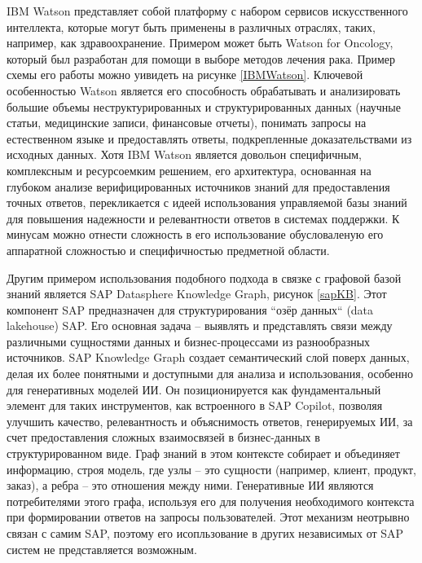 IBM Watson представляет собой платформу с набором сервисов искусственного интеллекта, которые могут быть применены в различных отраслях, таких, например, как здравоохранение. Примером может быть Watson for Oncology, который был разработан для помощи в выборе методов лечения рака. Пример схемы его работы можно уивидеть на рисунке \ref{IBMWatson}. Ключевой особенностью Watson является его способность обрабатывать и анализировать большие объемы неструктурированных и структурированных данных (научные статьи, медицинские записи, финансовые отчеты), понимать запросы на естественном языке и предоставлять ответы, подкрепленные доказательствами из исходных данных. Хотя IBM Watson является довольон специфичным, комплексным и ресурсоемким решением, его архитектура, основанная на глубоком анализе верифицированных источников знаний для предоставления точных ответов, перекликается с идеей использования управляемой базы знаний для повышения надежности и релевантности ответов в системах поддержки. К минусам можно отнести сложность в его использование обусловаленую его аппаратной сложностью и специфичностью предметной области.


Другим примером использования подобного подхода в связке с графовой базой знаний является SAP Datasphere Knowledge Graph, рисунок \ref{sapKB}. Этот компонент SAP предназначен для структурирования ``озёр данных`` (data lakehouse) SAP. Его основная задача – выявлять и представлять связи между различными сущностями данных и бизнес-процессами из разнообразных источников. SAP Knowledge Graph создает семантический слой поверх данных, делая их более понятными и доступными для анализа и использования, особенно для генеративных моделей ИИ. Он позиционируется как фундаментальный элемент для таких инструментов, как встроенного в SAP Copilot, позволяя улучшить качество, релевантность и объяснимость ответов, генерируемых ИИ, за счет предоставления сложных взаимосвязей в бизнес-данных в структурированном виде. Граф знаний в этом контексте собирает и объединяет информацию, строя модель, где узлы – это сущности (например, клиент, продукт, заказ), а ребра – это отношения между ними. Генеративные ИИ являются потребителями этого графа, используя его для получения необходимого контекста при формировании ответов на запросы пользователей. Этот механизм неотрывно связан с самим SAP, поэтому его исопльзование в других независимых от SAP систем не представляется возможным.




